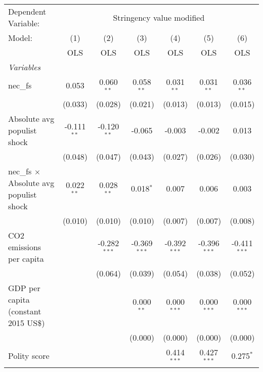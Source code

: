 
\begingroup
\centering
\begin{tabular}{lcccccc}
   \toprule
   Dependent Variable: & \multicolumn{6}{c}{Stringency value modified}\\
   Model:                                         & (1)           & (2)            & (3)            & (4)            & (5)            & (6)\\  
                                                  &  OLS          & OLS            & OLS            & OLS            & OLS            & OLS\\  
   \midrule
   \emph{Variables}\\
   nec\_fs                                        & 0.053         & 0.060$^{**}$   & 0.058$^{**}$   & 0.031$^{**}$   & 0.031$^{**}$   & 0.036$^{**}$\\   
                                                  & (0.033)       & (0.028)        & (0.021)        & (0.013)        & (0.013)        & (0.015)\\   
   Absolute avg populist shock                    & -0.111$^{**}$ & -0.120$^{**}$  & -0.065         & -0.003         & -0.002         & 0.013\\   
                                                  & (0.048)       & (0.047)        & (0.043)        & (0.027)        & (0.026)        & (0.030)\\   
   nec\_fs $\times$ Absolute avg populist shock   & 0.022$^{**}$  & 0.028$^{**}$   & 0.018$^{*}$    & 0.007          & 0.006          & 0.003\\   
                                                  & (0.010)       & (0.010)        & (0.010)        & (0.007)        & (0.007)        & (0.008)\\   
   CO2 emissions per capita                       &               & -0.282$^{***}$ & -0.369$^{***}$ & -0.392$^{***}$ & -0.396$^{***}$ & -0.411$^{***}$\\   
                                                  &               & (0.064)        & (0.039)        & (0.054)        & (0.038)        & (0.052)\\   
   GDP per capita (constant 2015 US\$)            &               &                & 0.000$^{**}$   & 0.000$^{***}$  & 0.000$^{***}$  & 0.000$^{***}$\\   
                                                  &               &                & (0.000)        & (0.000)        & (0.000)        & (0.000)\\   
   Polity score                                   &               &                &                & 0.414$^{***}$  & 0.427$^{***}$  & 0.275$^{*}$\\   

\end{tabular}
